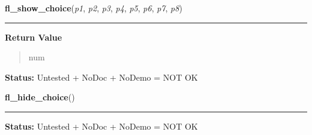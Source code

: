     \label{xformslib:flgoodies:fl_show_choice}

    \vspace{0.5ex}

\hspace{.8\funcindent}\begin{boxedminipage}{\funcwidth}

    \raggedright \textbf{fl\_show\_choice}(\textit{p1}, \textit{p2}, \textit{p3}, \textit{p4}, \textit{p5}, \textit{p6}, \textit{p7}, \textit{p8})

    \vspace{-1.5ex}

    \rule{\textwidth}{0.5\fboxrule}
\setlength{\parskip}{2ex}
\setlength{\parskip}{1ex}
      \textbf{Return Value}
    \vspace{-1ex}

      \begin{quote}
      num

      \end{quote}

\textbf{Status:} Untested + NoDoc + NoDemo = NOT OK



    \end{boxedminipage}

    \label{xformslib:flgoodies:fl_hide_choice}

    \vspace{0.5ex}

\hspace{.8\funcindent}\begin{boxedminipage}{\funcwidth}

    \raggedright \textbf{fl\_hide\_choice}()

    \vspace{-1.5ex}

    \rule{\textwidth}{0.5\fboxrule}
\setlength{\parskip}{2ex}
\setlength{\parskip}{1ex}
\textbf{Status:} Untested + NoDoc + NoDemo = NOT OK



    \end{boxedminipage}

    \label{xformslib:flgoodies:fl_set_choices_shortcut}

